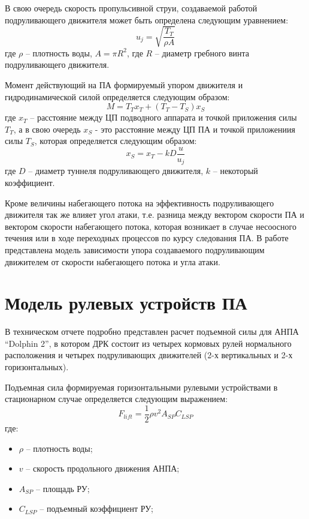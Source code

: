 В свою очередь скорость пропульсивной струи, создаваемой работой подруливающего движителя может быть определена следующим уравнением:
\begin{equation*}
	u_j = \sqrt{\frac{T_T}{\rho A}}
\end{equation*}
\noindent где $\rho$ -- плотность воды, $A=\pi R^2$, где $R$ -- диаметр гребного винта подруливающего движителя.

Момент действующий на ПА формируемый упором движителя и гидродинамической силой определяется следующим образом:
\begin{equation*}
	M = T_T x_T + (T_T-T_S)x_S
\end{equation*}
\noindent где $x_T$ -- расстояние между ЦП подводного аппарата и точкой приложения силы $T_T$, а в свою очередь $x_S$ - это расстояние между ЦП ПА и точкой приложениия силы $T_S$, которая определяется следующим образом:
\begin{equation*}
	x_S = x_T - kD\frac{u}{u_j}
\end{equation*}
\noindent где $D$ -- диаметр туннеля подруливающего движителя, $k$ -- некоторый коэффициент.

Кроме величины набегающего потока на эффективность подруливающего движителя так же влияет угол атаки, т.е. разница между вектором скорости ПА и вектором скорости набегающего потока, которая возникает в случае несоосного течения или в ходе переходных процессов по курсу следования ПА.
В работе \cite{palmer2008modelling} представлена модель зависимости упора создаваемого подруливающим движителем от скорости набегающего потока и угла атаки.

\section{Модель рулевых устройств ПА}
В техническом отчете \cite{steenson2011control} подробно представлен расчет подъемной силы для АНПА ``Dolphin 2'', в котором ДРК состоит из четырех кормовых рулей нормального расположения и четырех подруливающих движителей (2-х вертикальных и 2-х горизонтальных).

Подъемная сила формируемая горизонтальными рулевыми устройствами в стационарном случае определяется следующим выражением:
\begin{equation}
    F_{lift} = \frac{1}{2}\rho v^2 A_{SP} C_{LSP}
\end{equation}
\noindent где:
\begin{itemize}
    \item $\rho$ -- плотность воды;
    \item $v$ -- скорость продольного движения АНПА;
    \item $A_{SP}$ -- площадь РУ;
    \item $C_{LSP}$ -- подъемный коэффициент РУ;
\end{itemize}

